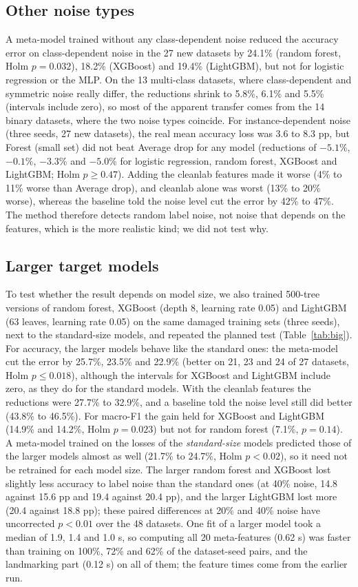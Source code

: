 \documentclass[conference]{IEEEtran}
\begin{document}
\subsection{Other noise types}
A meta-model trained without any class-dependent noise reduced the accuracy error on class-dependent noise in the 27 new datasets by 24.1\% (random forest, Holm $p=0.032$), 18.2\% (XGBoost) and 19.4\% (LightGBM), but not for logistic regression or the MLP. On the 13 multi-class datasets, where class-dependent and symmetric noise really differ, the reductions shrink to 5.8\%, 6.1\% and 5.5\% (intervals include zero), so most of the apparent transfer comes from the 14 binary datasets, where the two noise types coincide. For instance-dependent noise (three seeds, 27 new datasets), the real mean accuracy loss was 3.6 to 8.3 pp, but Forest (small set) did not beat Average drop for any model (reductions of $-5.1$\%, $-0.1$\%, $-3.3$\% and $-5.0$\% for logistic regression, random forest, XGBoost and LightGBM; Holm $p\geq 0.47$). Adding the cleanlab features made it worse (4\% to 11\% worse than Average drop), and cleanlab alone was worst (13\% to 20\% worse), whereas the baseline told the noise level cut the error by 42\% to 47\%. The method therefore detects random label noise, not noise that depends on the features, which is the more realistic kind; we did not test why.

\subsection{Larger target models}
To test whether the result depends on model size, we also trained 500-tree versions of random forest, XGBoost (depth 8, learning rate 0.05) and LightGBM (63 leaves, learning rate 0.05) on the same damaged training sets (three seeds), next to the standard-size models, and repeated the planned test (Table~\ref{tab:big}). For accuracy, the larger models behave like the standard ones: the meta-model cut the error by 25.7\%, 23.5\% and 22.9\% (better on 21, 23 and 24 of 27 datasets, Holm $p\leq0.018$), although the intervals for XGBoost and LightGBM include zero, as they do for the standard models. With the cleanlab features the reductions were 27.7\% to 32.9\%, and a baseline told the noise level still did better (43.8\% to 46.5\%). For macro-F1 the gain held for XGBoost and LightGBM (14.9\% and 14.2\%, Holm $p=0.023$) but not for random forest (7.1\%, $p=0.14$). A meta-model trained on the losses of the \emph{standard-size} models predicted those of the larger models almost as well (21.7\% to 24.7\%, Holm $p<0.02$), so it need not be retrained for each model size. The larger random forest and XGBoost lost slightly less accuracy to label noise than the standard ones (at 40\% noise, 14.8 against 15.6 pp and 19.4 against 20.4 pp), and the larger LightGBM lost more (20.4 against 18.8 pp); these paired differences at 20\% and 40\% noise have uncorrected $p<0.01$ over the 48 datasets. One fit of a larger model took a median of 1.9, 1.4 and 1.0 s, so computing all 20 meta-features (0.62 s) was faster than training on 100\%, 72\% and 62\% of the dataset-seed pairs, and the landmarking part (0.12 s) on all of them; the feature times come from the earlier run.
\end{document}
